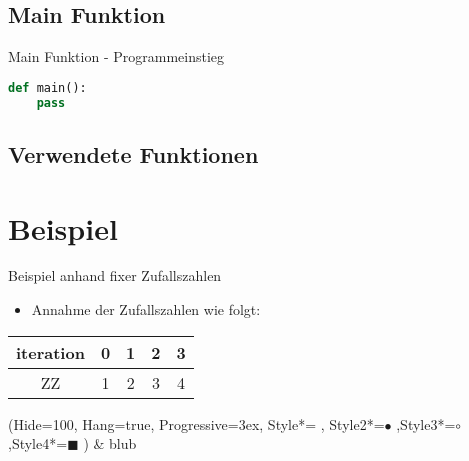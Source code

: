 \subsection{Main Funktion}
\begin{frame}[fragile]{Main Funktion - Programmeinstieg}
  \begin{lstlisting}[language=python]
def main():
	pass
\end{lstlisting}
\logopythonbottom
\end{frame}

\subsection{Verwendete Funktionen}
%
%


\section{Beispiel}
\begin{frame}[fragile]{Beispiel anhand fixer Zufallszahlen}
\begin{itemize}
\item Annahme der Zufallszahlen wie folgt:
\end{itemize}
\begin{center}
  \begin{tabular}{c|c|c|c|c}
  \hline 
  iteration & 0 & 1 & 2 & 3\\ 
  \hline 
  ZZ      & 1 & 2 & 3 & 4 \\ 
  \end{tabular} 
\end{center}
\begin{easylist}
\ListProperties(Hide=100, Hang=true, Progressive=3ex, Style*= ,
Style2*=$\bullet$ ,Style3*=$\circ$ ,Style4*=\tiny$\blacksquare$ )
& blub
\end{easylist}
\end{frame}


